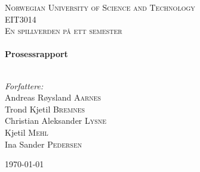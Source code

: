 
\begin{titlepage}

\begin{center}
 

\textsc{\LARGE Norwegian University of Science and Technology}\\[1.5cm]

 
\textsc{\Large EIT3014}\\[0.5cm]

\textsc{\large En spillverden på ett semester}\\[0.5cm]
 
 
\HRule \\[0.4cm]
{ \huge \bfseries Prosessrapport}\\[0.4cm]
 
\HRule \\[1.5cm]
 

\begin{center} \Large
\emph{Forfattere:}\\
Andreas Røysland \textsc{Aarnes}\\
Trond Kjetil \textsc{Bremnes}\\
Christian Aleksander \textsc{Lysne}\\
Kjetil \textsc{Mehl}\\
Ina Sander \textsc{Pedersen}\\ [3cm]
\end{center}
 

{\large \today}\\[4cm] %
 
\vfill
\end{center}

\end{titlepage}
